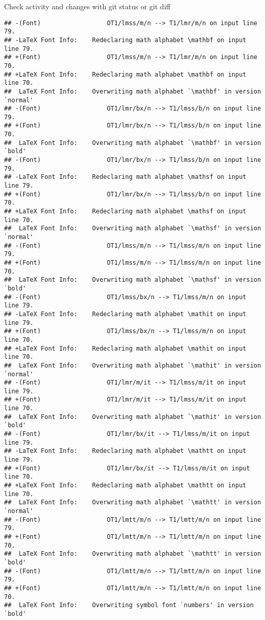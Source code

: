 \documentclass[ignorenonframetext,]{beamer}
\begin{document}
\begin{frame}[fragile]{Check activity and changes with git status or git
diff}
\begin{verbatim}
## -(Font)                  OT1/lmss/m/n --> T1/lmr/m/n on input line 79.
## -LaTeX Font Info:    Redeclaring math alphabet \mathbf on input line 79.
## +(Font)                  OT1/lmss/m/n --> T1/lmr/m/n on input line 70.
## +LaTeX Font Info:    Redeclaring math alphabet \mathbf on input line 70.
##  LaTeX Font Info:    Overwriting math alphabet `\mathbf' in version `normal'
## -(Font)                  OT1/lmr/bx/n --> T1/lmss/b/n on input line 79.
## +(Font)                  OT1/lmr/bx/n --> T1/lmss/b/n on input line 70.
##  LaTeX Font Info:    Overwriting math alphabet `\mathbf' in version `bold'
## -(Font)                  OT1/lmr/bx/n --> T1/lmss/b/n on input line 79.
## -LaTeX Font Info:    Redeclaring math alphabet \mathsf on input line 79.
## +(Font)                  OT1/lmr/bx/n --> T1/lmss/b/n on input line 70.
## +LaTeX Font Info:    Redeclaring math alphabet \mathsf on input line 70.
##  LaTeX Font Info:    Overwriting math alphabet `\mathsf' in version `normal'
## -(Font)                  OT1/lmss/m/n --> T1/lmss/m/n on input line 79.
## +(Font)                  OT1/lmss/m/n --> T1/lmss/m/n on input line 70.
##  LaTeX Font Info:    Overwriting math alphabet `\mathsf' in version `bold'
## -(Font)                  OT1/lmss/bx/n --> T1/lmss/m/n on input line 79.
## -LaTeX Font Info:    Redeclaring math alphabet \mathit on input line 79.
## +(Font)                  OT1/lmss/bx/n --> T1/lmss/m/n on input line 70.
## +LaTeX Font Info:    Redeclaring math alphabet \mathit on input line 70.
##  LaTeX Font Info:    Overwriting math alphabet `\mathit' in version `normal'
## -(Font)                  OT1/lmr/m/it --> T1/lmss/m/it on input line 79.
## +(Font)                  OT1/lmr/m/it --> T1/lmss/m/it on input line 70.
##  LaTeX Font Info:    Overwriting math alphabet `\mathit' in version `bold'
## -(Font)                  OT1/lmr/bx/it --> T1/lmss/m/it on input line 79.
## -LaTeX Font Info:    Redeclaring math alphabet \mathtt on input line 79.
## +(Font)                  OT1/lmr/bx/it --> T1/lmss/m/it on input line 70.
## +LaTeX Font Info:    Redeclaring math alphabet \mathtt on input line 70.
##  LaTeX Font Info:    Overwriting math alphabet `\mathtt' in version `normal'
## -(Font)                  OT1/lmtt/m/n --> T1/lmtt/m/n on input line 79.
## +(Font)                  OT1/lmtt/m/n --> T1/lmtt/m/n on input line 70.
##  LaTeX Font Info:    Overwriting math alphabet `\mathtt' in version `bold'
## -(Font)                  OT1/lmtt/m/n --> T1/lmtt/m/n on input line 79.
## +(Font)                  OT1/lmtt/m/n --> T1/lmtt/m/n on input line 70.
##  LaTeX Font Info:    Overwriting symbol font `numbers' in version `bold'

\end{verbatim}
\end{frame}
\end{document}
